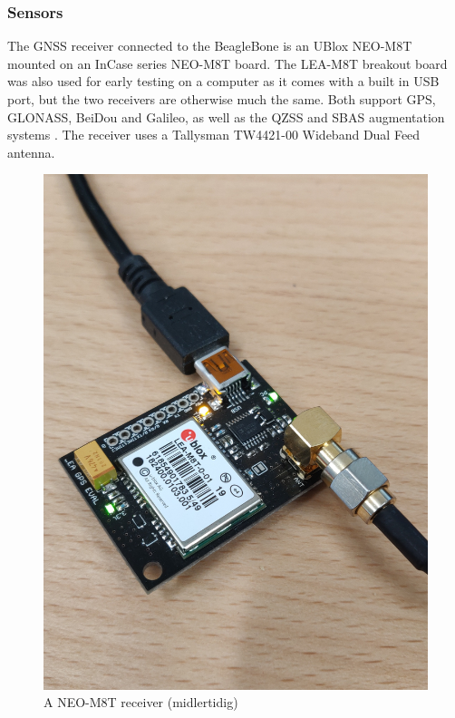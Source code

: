     \subsubsection{Sensors}
    The GNSS receiver connected to the BeagleBone is an UBlox NEO-M8T mounted on an InCase series NEO-M8T board. The LEA-M8T breakout board was also used for early testing on a computer as it comes with a built in USB port, but the two receivers are otherwise much the same. Both support GPS, GLONASS, BeiDou and Galileo, as well as the QZSS and SBAS augmentation systems \cite{ublox:neo-m8t}. The receiver uses a Tallysman TW4421-00 Wideband Dual Feed antenna.\\
    \begin{figure}[!htbp]
        \centering
        \includegraphics[angle=180, scale=0.05]{Implementation/Images/lea-m8t.jpg}
        \caption{A NEO-M8T receiver (midlertidig)}
        \label{fig:neo-m8t}
    \end{figure}
             
